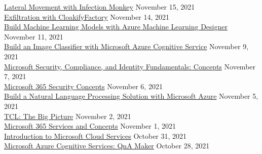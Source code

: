 \documentclass[10pt]{res} %
\begin{document}
\begin{resume}
\href{https://bjdelacruz.dev/files/certificates/pluralsight/49_Lateral_Movement_with_Infection_Monkey.pdf}{\color{blue}Lateral Movement with Infection Monkey} \hfill November 15, 2021 \\
\href{https://bjdelacruz.dev/files/certificates/pluralsight/59_Exfiltration_with_CloakifyFactory.pdf}{\color{blue}Exfiltration with CloakifyFactory} \hfill November 14, 2021 \\
\href{https://bjdelacruz.dev/files/certificates/pluralsight/4_Build_Machine_Learning_Models_with_Azure_Machine_Learning_Designer.pdf}{\color{blue}Build Machine Learning Models with Azure Machine Learning Designer} \hfill November 11, 2021 \\
\href{https://bjdelacruz.dev/files/certificates/pluralsight/6_Build_an_Image_Classifier_with_Microsoft_Azure_Cognitive_Service.pdf}{\color{blue}Build an Image Classifier with Microsoft Azure Cognitive Service} \hfill November 9, 2021 \\
\href{https://bjdelacruz.dev/files/certificates/pluralsight/1_Microsoft_Security_Compliance_and_Identity_Fundamentals_Concepts.pdf}{\color{blue}Microsoft Security, Compliance, and Identity Fundamentals: Concepts} \hfill November 7, 2021 \\
\href{https://bjdelacruz.dev/files/certificates/pluralsight/3_Microsoft_365_Security_Concepts.pdf}{\color{blue}Microsoft 365 Security Concepts} \hfill November 6, 2021 \\
\href{https://bjdelacruz.dev/files/certificates/pluralsight/9_Build_a_Natural_Language_Processing_Solution_with_Microsoft_Azure.pdf}{\color{blue}Build a Natural Language Processing Solution with Microsoft Azure} \hfill November 5, 2021 \\
\href{https://bjdelacruz.dev/files/certificates/pluralsight/TCL_The_Big_Picture.pdf}{\color{blue}TCL: The Big Picture} \hfill November 2, 2021 \\
\href{https://bjdelacruz.dev/files/certificates/pluralsight/2_Microsoft_365_Services_and_Concepts.pdf}{\color{blue}Microsoft 365 Services and Concepts} \hfill November 1, 2021 \\
\href{https://bjdelacruz.dev/files/certificates/pluralsight/1_Introduction_to_Microsoft_Cloud_Services.pdf}{\color{blue}Introduction to Microsoft Cloud Services} \hfill October 31, 2021 \\
\href{https://bjdelacruz.dev/files/certificates/pluralsight/Microsoft_Azure_Cognitive_Services_QnA_Maker.pdf}{\color{blue}Microsoft Azure Cognitive Services: QnA Maker} \hfill October 28, 2021 \\

\end{resume}
\end{document}
